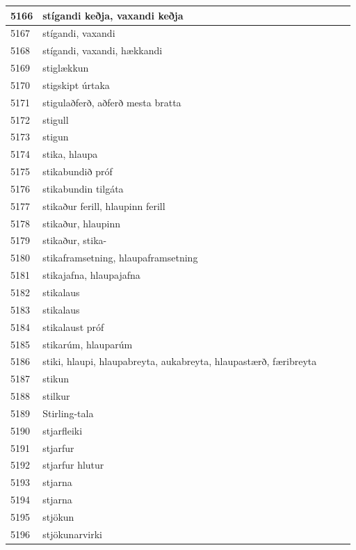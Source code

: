\begin{longtable}{p{}|p{}|p{}|p{}|p{}}
5166 & stígandi keðja, vaxandi keðja &  &  &  \\
\hline
5167 & stígandi, vaxandi &  &  &  \\
\hline
5168 & stígandi, vaxandi, hækkandi &  &  &  \\
\hline
5169 & stiglækkun &  &  &  \\
\hline
5170 & stigskipt úrtaka &  &  &  \\
\hline
5171 & stigulaðferð, aðferð mesta bratta &  &  &  \\
\hline
5172 & stigull &  &  &  \\
\hline
5173 & stigun &  &  &  \\
\hline
5174 & stika, hlaupa &  &  &  \\
\hline
5175 & stikabundið próf &  &  &  \\
\hline
5176 & stikabundin tilgáta &  &  &  \\
\hline
5177 & stikaður ferill, hlaupinn ferill &  &  &  \\
\hline
5178 & stikaður, hlaupinn &  &  &  \\
\hline
5179 & stikaður, stika- &  &  &  \\
\hline
5180 & stikaframsetning, hlaupaframsetning &  &  &  \\
\hline
5181 & stikajafna, hlaupajafna &  &  &  \\
\hline
5182 & stikalaus &  &  &  \\
\hline
5183 & stikalaus &  &  &  \\
\hline
5184 & stikalaust próf &  &  &  \\
\hline
5185 & stikarúm, hlauparúm &  &  &  \\
\hline
5186 & stiki, hlaupi, hlaupabreyta, aukabreyta, hlaupastærð, færibreyta &  &  &  \\
\hline
5187 & stikun &  &  &  \\
\hline
5188 & stilkur &  &  &  \\
\hline
5189 & Stirling-tala &  &  &  \\
\hline
5190 & stjarfleiki &  &  &  \\
\hline
5191 & stjarfur &  &  &  \\
\hline
5192 & stjarfur hlutur &  &  &  \\
\hline
5193 & stjarna &  &  &  \\
\hline
5194 & stjarna &  &  &  \\
\hline
5195 & stjökun &  &  &  \\
\hline
5196 & stjökunarvirki &  &  &  \\
\hline

\end{longtable}
